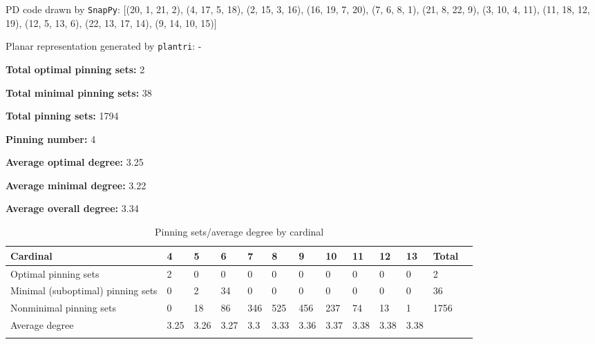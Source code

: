 \documentclass{article}%
\begin{document}
{\small\noindent PD code drawn by \texttt{SnapPy}: [(20, 1, 21, 2), (4, 17, 5, 18), (2, 15, 3, 16), (16, 19, 7, 20), (7, 6, 8, 1), (21, 8, 22, 9), (3, 10, 4, 11), (11, 18, 12, 19), (12, 5, 13, 6), (22, 13, 17, 14), (9, 14, 10, 15)]}

{\small\noindent Planar representation generated by \texttt{plantri}: -}

\begin{multicols}{2}
{\normalsize \noindent\textbf{Total optimal pinning sets:} 2

\noindent\textbf{Total minimal pinning sets:} 38

\noindent\textbf{Total pinning sets:} 1794

\noindent\textbf{Pinning number:} 4

}
\columnbreak

{\normalsize \noindent\textbf{Average optimal degree:} 3.25

\noindent\textbf{Average minimal degree:} 3.22

\noindent\textbf{Average overall degree:} 3.34

}
\end{multicols}

\begin{table}[ht]
	\caption{Pinning sets/average degree by cardinal}
	\centering
	\renewcommand{\arraystretch}{1.5}
	\begin{tabularx}{\textwidth}{lXXXXXXXXXXXX}
		\toprule
			Cardinal & 4 & 5 & 6 & 7 & 8 & 9 & 10 & 11 & 12 & 13 & Total\\
			\hline
			Optimal pinning sets & 2 & 0 & 0 & 0 & 0 & 0 & 0 & 0 & 0 & 0 & 2 \\
			Minimal (suboptimal) pinning sets & 0 & 2 & 34 & 0 & 0 & 0 & 0 & 0 & 0 & 0 & 36 \\
			Nonminimal pinning sets & 0 & 18 & 86 & 346 & 525 & 456 & 237 & 74 & 13 & 1 & 1756 \\
			Average degree & 3.25 & 3.26 & 3.27 & 3.3 & 3.33 & 3.36 & 3.37 & 3.38 & 3.38 & 3.38 &  \\
		\bottomrule \\ 
	\end{tabularx}
\end{table}
\end{document}
